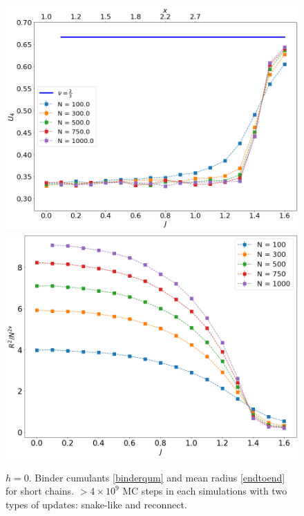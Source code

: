  \begin{figure}[H]
 	\centering
 	\includegraphics[scale=0.36]{Images/bindercumulants_shortchains.png} \\
 	 	\includegraphics[scale=0.36]{Images/rscaling_shortchains.png}
 	\caption{$h=0$. Binder  cumulants \eqref{binderqum} and mean radius \eqref{endtoend} for short chains. $ > 4 \times 10^{9} $ MC steps in each simulations with two  types of updates: snake-like and reconnect.    }
 	\label{fig:bcshort}
 \end{figure}
 